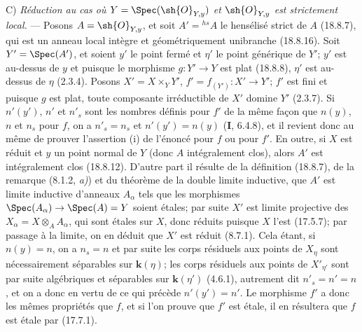 C) \emph{Réduction au cas où $Y=\Spec(\sh{O}_{Y,y})$ et $\sh{O}_{Y,y}$ est strictement local.} --- Posons $A=\sh{O}_{Y,y}$, et soit $A'={}^{hs}\!A$ le hensélisé strict de $A$ (18.8.7), qui est un anneau local intègre et géométriquement unibranche (18.8.16). Soit $Y'=\Spec(A')$, et soient $y'$ le point fermé et $\eta'$ le point générique de $Y'$; $y'$ est au-dessus de $y$ et puisque le morphisme $g:Y'\to Y$ est plat (18.8.8), $\eta'$ est au-dessus de $\eta$ (2.3.4). Posons $X'=X\times_Y Y'$, $f'=f_{(Y')}:X'\to Y'$; $f'$ est fini et puisque $g$ est plat, toute composante irréductible de $X'$ domine $Y'$ (2.3.7).
Si $n'(y')$, $n'$ et $n'_s$ sont les nombres définis pour $f'$ de la même façon que $n(y)$, $n$ et $n_s$ pour $f$, on a $n'_s=n_s$ et $n'(y')=n(y)$ (\textbf{I}, 6.4.8), et il revient donc au même de prouver l'assertion (i) de l'énoncé pour $f$ ou pour $f'$. En outre, si $X$ est réduit et $y$ un point normal de $Y$ (donc $A$ intégralement clos), alors $A'$ est intégralement clos (18.8.12). D'autre part il résulte de la définition (18.8.7), de la remarque (8.1.2, \emph{a)}) et du théorème de la double limite inductive, que $A'$ est limite inductive d'anneaux $A_\alpha$ tels que les morphismes $\Spec(A_\alpha)\to\Spec(A)=Y$ soient étales; par suite $X'$ est limite projective des $X_\alpha=X\otimes_A A_\alpha$, qui sont étales sur $X$, donc réduits puisque $X$ l'est (17.5.7); par passage à la limite,
on en déduit que $X'$ est réduit (8.7.1). Cela étant, si $n(y)=n$, on a $n_s=n$ et par suite les corps résiduels aux points de $X_\eta$ sont nécessairement séparables sur $\boldsymbol{k}(\eta)$; les corps résiduels aux points de $X'_{\eta'}$ sont par suite algébriques et séparables sur $\boldsymbol{k}(\eta')$ (4.6.1), autrement dit $n'_s=n'=n$, et on a donc en vertu de ce qui précède $n'(y')=n'$. Le morphisme $f'$ a donc les mêmes propriétés que $f$, et si l'on prouve que $f'$ est étale, il en résultera que $f$ est étale par (17.7.1).

